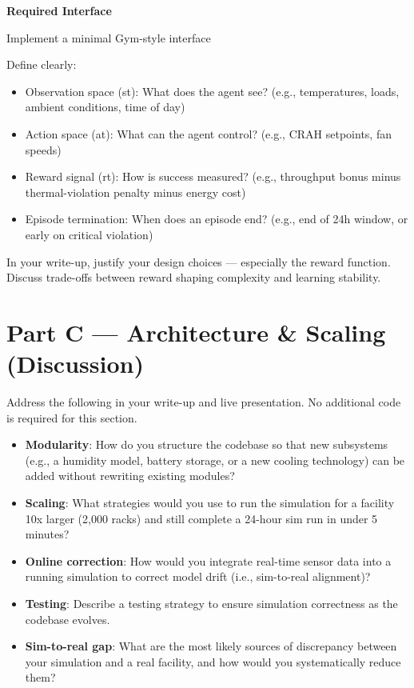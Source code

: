 \documentclass[letterpaper,11pt]{article}
\begin{document}
\textbf{Required Interface}

Implement a minimal Gym-style interface


Define clearly:
\begin{itemize}[label=--]
	\item Observation space (st): What does the agent see? (e.g., temperatures, loads, ambient
	conditions, time of day)
	\item Action space (at): What can the agent control? (e.g., CRAH setpoints, fan speeds)
	\item Reward signal (rt): How is success measured? (e.g., throughput bonus minus
	thermal-violation penalty minus energy cost)
	\item Episode termination: When does an episode end? (e.g., end of 24h window, or early on
	critical violation)
\end{itemize}
In your write-up, justify your design choices — especially the reward function. Discuss trade-offs between reward
shaping complexity and learning stability.

\section{Part C — Architecture \& Scaling (Discussion)}
Address the following in your write-up and live presentation. No additional code is required for this
section.
\begin{itemize}[label=--]
\item \textbf{Modularity}: How do you structure the codebase so that new subsystems (e.g., a humidity
model, battery storage, or a new cooling technology) can be added without rewriting existing
modules?
\item \textbf{Scaling}: What strategies would you use to run the simulation for a facility 10x larger (2,000
racks) and still complete a 24-hour sim run in under 5 minutes?
\item \textbf{Online correction}: How would you integrate real-time sensor data into a running simulation
to correct model drift (i.e., sim-to-real alignment)?
\item \textbf{Testing}: Describe a testing strategy to ensure simulation correctness as the codebase
evolves.
\item \textbf{Sim-to-real gap}: What are the most likely sources of discrepancy between your simulation
and a real facility, and how would you systematically reduce them?
\end{itemize}
\end{document}
